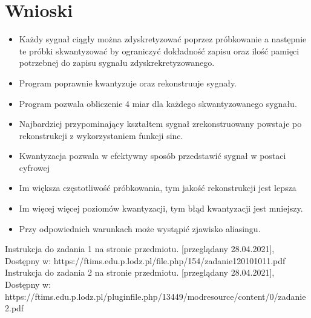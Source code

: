 \documentclass[12pt]{article}
\begin{document}

\section{Wnioski}
\begin{itemize}
    \item Każdy sygnał ciągły można zdyskretyzować poprzez próbkowanie a następnie te próbki skwantyzować by ograniczyć dokładność zapisu oraz ilość pamięci potrzebnej do zapisu sygnału zdyskrekretyzowanego.
    \item Program poprawnie kwantyzuje oraz rekonstruuje sygnały.
    \item Program pozwala obliczenie 4 miar dla każdego skwantyzowanego sygnału.
    \item Najbardziej przypominający kształtem sygnał zrekonstruowany powstaje po rekonstrukcji z wykorzystaniem funkcji sinc.
    \item Kwantyzacja pozwala w efektywny sposób przedstawić sygnał w postaci cyfrowej
    \item Im większa częstotliwość próbkowania, tym jakość rekonstrukcji jest lepsza
    \item Im więcej więcej poziomów kwantyzacji, tym błąd kwantyzacji jest mniejszy.
    \item Przy odpowiednich warunkach może wystąpić zjawisko aliasingu.
\end{itemize}
 

\begin{thebibliography}{}
 Instrukcja do zadania 1 na stronie przedmiotu. [przeglądany 28.04.2021], Dostępny w: https://ftims.edu.p.lodz.pl/file.php/154/zadanie120101011.pdf
 Instrukcja do zadania 2 na stronie przedmiotu. [przeglądany 28.04.2021], Dostępny w: {https://ftims.edu.p.lodz.pl/pluginfile.php/13449/modresource/content/0/zadanie2.pdf}

\end{thebibliography}
\end{document}
